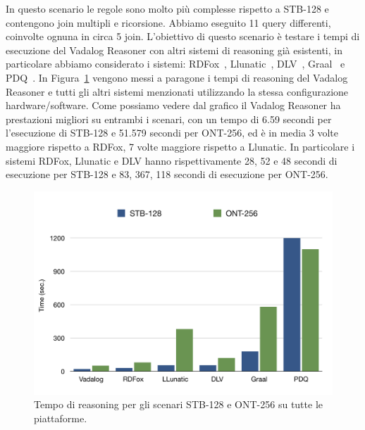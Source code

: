 In questo scenario le regole sono molto più complesse rispetto a STB-128 e contengono join multipli e ricorsione. Abbiamo eseguito 11 query differenti, coinvolte ognuna in circa 5 join. \newline
L'obiettivo di questo scenario è testare i tempi di esecuzione del Vadalog Reasoner con altri sistemi di reasoning già esistenti, in particolare abbiamo considerato i sistemi: RDFox~\cite{motik2014parallel}, Llunatic~\cite{geerts2014s}, DLV~\cite{leone2006dlv}, Graal~\cite{baget2015graal} e PDQ~\cite{benedikt2015querying}. \newline
In Figura~\ref{fig:ibenchgrafico} vengono messi a paragone i tempi di reasoning del Vadalog Reasoner e tutti gli altri sistemi menzionati utilizzando la stessa configurazione hardware/software. \newline
Come possiamo vedere dal grafico il Vadalog Reasoner ha prestazioni migliori su entrambi i scenari, con un tempo di 6.59 secondi per l'esecuzione di STB-128 e 51.579 secondi per ONT-256, ed è in media 3 volte maggiore rispetto a RDFox, 7 volte maggiore rispetto a Llunatic.\newline 
In particolare i sistemi RDFox, Llunatic e DLV hanno rispettivamente 28, 52 e 48 secondi di esecuzione per STB-128 e 83, 367, 118 secondi di esecuzione per ONT-256.
\begin{figure}[h]
	\centering
	\includegraphics[width=0.8\linewidth]{figure/ibenchgrafico}
	\caption{Tempo di reasoning per gli scenari STB-128 e ONT-256 su tutte le piattaforme.}
	\label{fig:ibenchgrafico}
\end{figure}
